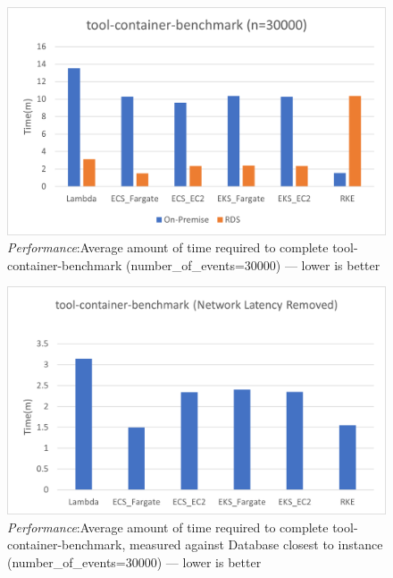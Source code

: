 \begin{figure}[hp]
  \includegraphics{images/perf-tcb_30000.png}
  \caption{\emph{Performance}:Average amount of time required to complete tool-container-benchmark (number\_of\_events=30000) --- lower is better}
  \label{fig:perf_tcb_30000}
\end{figure}

\begin{figure}[hp]
  \includegraphics{images/perf-tcb_network.png}
  \caption{\emph{Performance}:Average amount of time required to complete tool-container-benchmark, measured against Database closest to instance (number\_of\_events=30000) --- lower is better}
  \label{fig:perf_tcb_network}
\end{figure}

